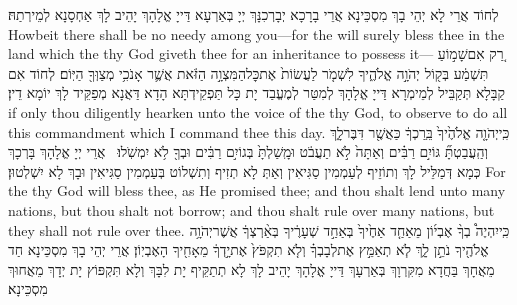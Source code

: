 {לְחוֹד אֲרֵי לָא יְהֵי בָךְ מִסְכֵּינָא אֲרֵי בָרָכָא יְבָרְכִנָּךְ יְיָ בְּאַרְעָא דַּייָ אֱלָהָךְ יָהֵיב לָךְ אַחְסָנָא לְמֵירְתַהּ׃}
{Howbeit there shall be no needy among you—for the \lord\space will surely bless thee in the land which the \lord\space thy God giveth thee for an inheritance to possess it—}{}
{רַ֚ק אִם\maqqaf שָׁמ֣וֹעַ תִּשְׁמַ֔ע בְּק֖וֹל יְהֹוָ֣ה אֱלֹהֶ֑יךָ לִשְׁמֹ֤ר לַעֲשׂוֹת֙ אֶת\maqqaf כׇּל\maqqaf הַמִּצְוָ֣ה הַזֹּ֔את אֲשֶׁ֛ר אָנֹכִ֥י מְצַוְּךָ֖ הַיּֽוֹם׃}
{לְחוֹד אִם קַבָּלָא תְּקַבֵּיל לְמֵימְרָא דַּייָ אֱלָהָךְ לְמִטַּר לְמֶעֱבַד יָת כָּל תַּפְקֵידְתָּא הָדָא דַּאֲנָא מְפַקֵּיד לָךְ יוֹמָא דֵין׃}
{if only thou diligently hearken unto the voice of the \lord\space thy God, to observe to do all this commandment which I command thee this day.}{}
{כִּֽי\maqqaf יְהֹוָ֤ה אֱלֹהֶ֙יךָ֙ בֵּֽרַכְךָ֔ כַּאֲשֶׁ֖ר דִּבֶּר\maqqaf לָ֑ךְ וְהַֽעֲבַטְתָּ֞ גּוֹיִ֣ם רַבִּ֗ים וְאַתָּה֙ לֹ֣א תַעֲבֹ֔ט וּמָֽשַׁלְתָּ֙ בְּגוֹיִ֣ם רַבִּ֔ים וּבְךָ֖ לֹ֥א יִמְשֹֽׁלוּ׃ \setuma }
{אֲרֵי יְיָ אֱלָהָךְ בָּרְכָךְ כְּמָא דְּמַלֵּיל לָךְ וְתוֹזֵיף לְעַמְמִין סַגִּיאִין וְאַתְּ לָא תְזִיף וְתִשְׁלוֹט בְּעַמְמִין סַגִּיאִין וּבָךְ לָא יִשְׁלְטוּן׃}
{For the \lord\space thy God will bless thee, as He promised thee; and thou shalt lend unto many nations, but thou shalt not borrow; and thou shalt rule over many nations, but they shall not rule over thee.}{}
{כִּֽי\maqqaf יִהְיֶה֩ בְךָ֨ אֶבְי֜וֹן מֵאַחַ֤ד אַחֶ֙יךָ֙ בְּאַחַ֣ד שְׁעָרֶ֔יךָ בְּאַ֨רְצְךָ֔ אֲשֶׁר\maqqaf יְהֹוָ֥ה אֱלֹהֶ֖יךָ נֹתֵ֣ן לָ֑ךְ לֹ֧א תְאַמֵּ֣ץ אֶת\maqqaf לְבָבְךָ֗ וְלֹ֤א תִקְפֹּץ֙ אֶת\maqqaf יָ֣דְךָ֔ מֵאָחִ֖יךָ הָאֶבְיֽוֹן׃}
{אֲרֵי יְהֵי בָךְ מִסְכֵּינָא חַד מֵאֲחָךְ בַּחֲדָא מִקִּרְוָךְ בְּאַרְעָךְ דַּייָ אֱלָהָךְ יָהֵיב לָךְ לָא תְתַקֵּיף יָת לִבָּךְ וְלָא תִּקְפּוֹץ יָת יְדָךְ מֵאֲחוּךְ מִסְכֵּינָא׃}
